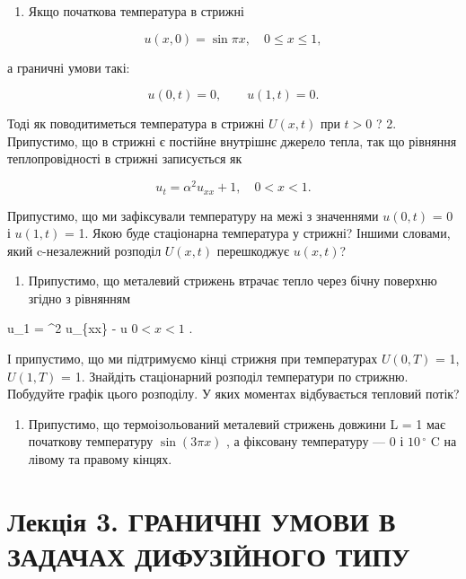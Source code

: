 \documentclass[
  ukrainian,
]{article}
\providecommand{\tightlist}{%
  \setlength{\itemsep}{0pt}\setlength{\parskip}{0pt}}
\begin{document}
\begin{enumerate}
\def\labelenumi{\arabic{enumi}.}
\tightlist
\item
  Якщо початкова температура в стрижні
\end{enumerate}

\[
u(x, 0) = \sin \pi x, \quad 0 \leqslant x \leqslant 1,
\]

а граничні умови такі:

\[
u(0, t) = 0, \qquad u(1, t) = 0.
\]

Тоді як поводитиметься температура в стрижні \(U(x, t)\) при \(t > 0\) ?
2. Припустимо, що в стрижні є постійне внутрішнє джерело тепла, так що
рівняння теплопровідності в стрижні записується як

\[
u_t = \alpha^2 u_{xx} + 1, \quad 0 < x < 1.
\]

Припустимо, що ми зафіксували температуру на межі з значеннями
\(u(0, t)\) = 0 і \(u(1, t)\) = 1. Якою буде стаціонарна температура у
стрижні? Іншими словами, який c-незалежний розподіл \(U(x, t)\)
перешкоджує \(u(x, t)\)?

\begin{enumerate}
\def\labelenumi{\arabic{enumi}.}
\setcounter{enumi}{2}
\tightlist
\item
  Припустимо, що металевий стрижень втрачає тепло через бічну поверхню
  згідно з рівнянням
\end{enumerate}

u\_1 = \alpha\^{}2 u\_\{xx\} - \beta u \(0 < x < 1\) .

І припустимо, що ми підтримуємо кінці стрижня при температурах
\(U(0, T)\) = 1, \(U(1, T)\) = 1. Знайдіть стаціонарний розподіл
температури по стрижню. Побудуйте графік цього розподілу. У яких
моментах відбувається тепловий потік?

\begin{enumerate}
\def\labelenumi{\arabic{enumi}.}
\setcounter{enumi}{3}
\tightlist
\item
  Припустимо, що термоізольований металевий стрижень довжини L = 1 має
  початкову температуру \(\sin(3\pi x)\) , а фіксовану температуру --- 0
  і \(10\,^{\circ}\) C на лівому та правому кінцях.
\end{enumerate}

\section{Лекція 3. ГРАНИЧНІ УМОВИ В ЗАДАЧАХ ДИФУЗІЙНОГО
ТИПУ}\label{ux43bux435ux43aux446ux456ux44f-3.-ux433ux440ux430ux43dux438ux447ux43dux456-ux443ux43cux43eux432ux438-ux432-ux437ux430ux434ux430ux447ux430ux445-ux434ux438ux444ux443ux437ux456ux439ux43dux43eux433ux43e-ux442ux438ux43fux443}
\end{document}
